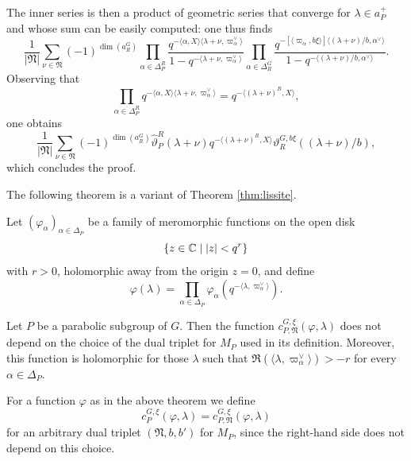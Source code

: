 \begin{paragr}
\begin{preuve}
The inner series is then a product of geometric series that converge for $\lambda\in a_P^+$ and whose sum can be easily computed: one thus finds
$$ \frac{1}{|\mathfrak{N}|}\sum_{\nu\in \mathfrak{N}} (-1)^{\dim(a_R^G)}\prod_{\alpha\in \Delta_P^R} \frac{q^{- \langle \alpha,X\rangle \langle \lambda+\nu,\varpi^\vee_\alpha\rangle }}{1-q^{-\langle \lambda+\nu,\varpi^\vee_\alpha\rangle }} \prod_{\alpha \in \Delta_R^G} \frac{q^{-[\langle  \varpi_\alpha,b\xi\rangle]\langle (\lambda+\nu)/b,\alpha^\vee\rangle }}{1-q^{-\langle (\lambda+\nu)/b,\alpha^\vee\rangle }} .$$
Observing that 
$$\prod_{\alpha\in \Delta_P^R} q^{-\langle \alpha,X\rangle \langle \lambda+\nu,\varpi^\vee_\alpha\rangle}=q^{ -\langle (\lambda+\nu)^R,X\rangle },$$
one obtains
$$\frac{1}{|\mathfrak{N}|}\sum_{\nu\in \mathfrak{N}}(-1)^{\dim(a_R^G)} \hat{\vartheta}_P^R(\lambda+\nu)  q^{ -\langle (\lambda+\nu)^R,X\rangle }  \vartheta_R^{G,b\xi}((\lambda+\nu)/b),$$
which concludes the proof.
\end{preuve}

The following theorem is a variant of Theorem \ref{thm:lissite}.

\begin{theoreme}
      \label{thm:lissitexi}
Let $(\varphi_\alpha)_{\alpha \in \Delta_P}$ be a family of meromorphic functions on the open disk 
$$\{z\in \mathbb{C} \mid |z|<q^{r} \}$$
with $r>0$, holomorphic away from the origin $z=0$, and define
\begin{equation}
  \label{eq:modelephi}
  \varphi(\lambda)=\prod_{\alpha\in \Delta_P} \varphi_\alpha(q^{-\langle \lambda,\varpi_\alpha^\vee\rangle}).
\end{equation}

Let $P$ be a parabolic subgroup of $G$. Then the function $c_{P,\mathfrak{N}}^{G,\xi}(\varphi,\lambda)$ does not depend on the choice of the dual triplet for $M_P$ used in its definition. Moreover, this function is holomorphic for those $\lambda$ such that $\Re(\langle \lambda,\varpi_\alpha^\vee\rangle)>-r$ for every $\alpha\in \Delta_P$. 
\end{theoreme}

\begin{remarque}\label{rq:notation}
For a function $\varphi$ as in the above theorem we define
\begin{equation}
  \label{eq:cPGxisansnu}
  c_{P}^{G,\xi}(\varphi,\lambda)=c_{P,\mathfrak{N}}^{G,\xi}(\varphi,\lambda)
\end{equation}
for an arbitrary dual triplet $(\mathfrak{N},b,b')$ for $M_P$, since the right-hand side does not depend on this choice.
\end{remarque}


\end{paragr}
